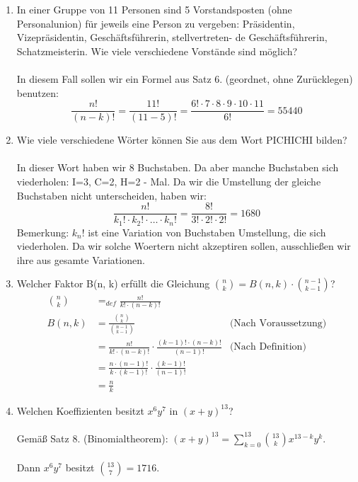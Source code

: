 \begin{enumerate}[label=(\alph*)]
        \item In einer Gruppe von 11 Personen sind 5 Vorstandsposten (ohne Personalunion) für jeweils
        eine Person zu vergeben: Präsidentin, Vizepräsidentin, Geschäftsführerin, stellvertreten-
        de Geschäftsführerin, Schatzmeisterin. Wie viele verschiedene Vorstände sind möglich?\\\\
        In diesem Fall sollen wir ein Formel aus Satz 6. (geordnet, ohne Zur\"ucklegen) benutzen:
        \[\frac{n!}{(n-k)!}=\frac{11!}{(11-5)!}
        =\frac{6!\cdot7\cdot8\cdot9\cdot10\cdot11}{6!}
        =55440\]

        \item Wie viele verschiedene Wörter können Sie aus dem Wort PICHICHI bilden?\\\\
        In dieser Wort haben wir 8 Buchstaben. Da aber manche Buchstaben sich viederholen: 
        I=3, C=2, H=2 - Mal. Da wir die Umstellung der gleiche Buchstaben nicht unterscheiden, haben wir:
        \[\frac{n!}{k_1!\cdot k_2!\cdot\ldots\cdot k_n!} = \frac{8!}{3!\cdot2!\cdot2!} = 1680\]
        Bemerkung: $k_n!$ ist eine Variation von Buchstaben Umstellung, die sich viederholen. 
        Da wir solche Woertern nicht akzeptiren sollen, ausschließen wir ihre aus gesamte Variationen. 

        \item Welcher Faktor B(n, k) erfüllt die Gleichung $\binom{n}{k} = B(n,k)\cdot\binom{n-1}{k-1}$?
        \begin{align*}
        \binom{n}{k} &=_{def} \frac{n!}{k!\cdot(n-k)!}\\
        B(n,k) &= \frac{\binom{n}{k}}{\binom{n-1}{k-1}} &\textrm{(Nach Voraussetzung)}\\
        &= \frac{n!}{k!\cdot(n-k)!} \cdot \frac{(k-1)!\cdot(n-k)!}{(n-1)!} &\textrm{(Nach Definition)}\\
        &= \frac{n\cdot(n-1)!}{k\cdot(k-1)!} \cdot \frac{(k-1)!}{(n-1)!}\\
        &= \frac{n}{k}
        \end{align*}
        
        \item Welchen Koeffizienten besitzt $x^6y^7$ in $(x+y)^{13}$?\\\\
        Gemäß Satz 8. (Binomialtheorem): $(x+y)^{13} = \sum_{k=0}^{13} \binom{13}{k}x^{13-k}y^k$.\\\\
        Dann $x^6y^7$ besitzt $\binom{13}{7} = 1716$.


\end{enumerate}
